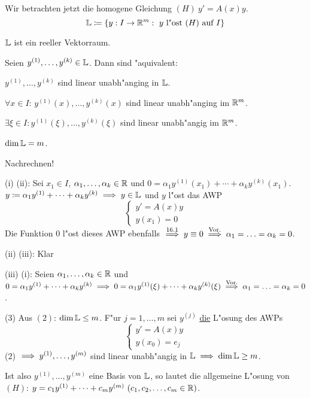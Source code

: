 \documentclass[a4paper,twoside,DIV15,BCOR12mm]{scrbook}
\begin{document}
Wir betrachten jetzt die homogene Gleichung $(H)\ y'=A(x)y$.
\[
	\MdL\da \{y:I\to\MdR^m:\ y\text{ l"ost } (H) \text{ auf } I\}
\]
\begin{satz} %
\begin{liste}
\item $\mathbb{L}$ ist ein reeller Vektorraum.
\item Seien $y^{(1)},\ldots,y^{(k)}\in\mathbb{L}$. Dann sind "aquivalent:
\begin{liste}
\item $y^{(1)},\ldots,y^{(k)}$ sind linear unabh"anging in $\mathbb{L}$.
\item $\forall x\in I$: $y^{(1)}(x),\ldots, y^{(k)}(x)$ sind linear unabh"anging im $\mathbb{R}^m$.
\item $\exists \xi\in I: y^{(1)}(\xi),\ldots, y^{(k)}(\xi)$ sind linear unabh"angig im $\mathbb{R}^m$.
\end{liste}
\item $\dim \mathbb{L}=m$.
\end{liste}
\end{satz}
\begin{beweise}
\item Nachrechnen!
\item
\begin{liste}
\item[(i)]\folgt (ii): Sei $x_1\in I$, $\alpha_1, \ldots, \alpha_k\in\mathbb{R}$ und $0=\alpha_1 y^{(1)}(x_1)+\cdots+\alpha_k y^{(k)}(x_1)$.
$y\da \alpha_1 y^{(1)}+\cdots+\alpha_k y^{(k)}\folgt y\in\MdL$ und $y$ l"ost das AWP
\[
	\begin{cases}
		y'=A(x)y\\
		y(x_1)=0
	\end{cases}
\]
Die Funktion 0 l"ost dieses AWP ebenfalls $\overset{16.1}{\implies} y\equiv 0\overset{\text{Vor.}}{\implies}\alpha_1=\ldots=\alpha_k=0$.
\item[(ii)]\folgt (iii): Klar
\item[(iii)]\folgt (i): Seien $\alpha_1,\ldots,\alpha_k\in\mathbb{R}$ und $0=\alpha_1 y^{(1)}+\cdots+\alpha_k y^{(k)}\implies 0=\alpha_1 y^{(1)}(\xi)+\cdots+\alpha_ky^{(k)}(\xi)\overset{\text{Vor.}}{\implies}\alpha_1=\ldots=\alpha_k=0$.
\end{liste}
\item[(3)]Aus $(2)$: $\dim\mathbb{L}\le m$. F"ur $j=1,\dots,m$ sei $y^{(j)}$ \underline{die} L"osung des AWPs
\[
\begin{cases}
	y'=A(x)y\\
	y(x_0)=e_j
\end{cases}
\]
(2) $\implies y^{(1)},\dots, y^{(m)}$ sind linear unabh"angig in $\mathbb{L}\implies\dim\mathbb{L}\ge m$.
\end{beweise}
Ist also $y^{(1)},\ldots,y^{(m)}$ eine Basis von $\mathbb{L}$, so lautet die allgemeine L"osung von $(H)$:
$y=c_1y^{(1)}+\cdots+c_my^{(m)}\ (c_1,c_2,\ldots,c_m\in\MdR)$.
\end{document}
